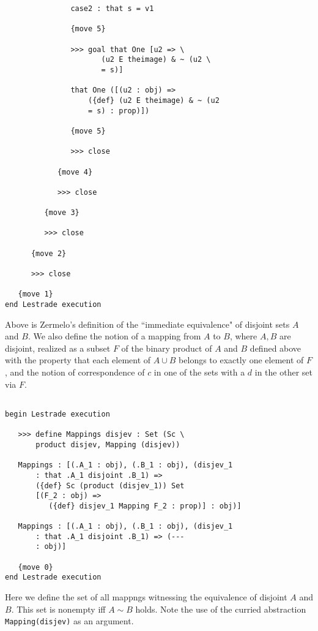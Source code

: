 \documentclass[12pt]{article}
\begin{document}
\begin{verbatim}
               case2 : that s = v1

               {move 5}

               >>> goal that One [u2 => \
                      (u2 E theimage) & ~ (u2 \
                      = s)]

               that One ([(u2 : obj) => 
                   ({def} (u2 E theimage) & ~ (u2 
                   = s) : prop)])

               {move 5}

               >>> close

            {move 4}

            >>> close

         {move 3}

         >>> close

      {move 2}

      >>> close

   {move 1}
end Lestrade execution
\end{verbatim}

Above is Zermelo's definition of the ``immediate equivalence" of disjoint sets $A$ and $B$.  We also define the notion of a mapping from $A$ to $B$, where $A,B$ are disjoint, 
realized as a subset $F$ of the binary product of $A$ and $B$ defined above with the property that each element of $A \cup B$ belongs to exactly one element of $F$, and the notion of correspondence of $c$ in one of the sets with a $d$ in the other set via $F$.

\begin{verbatim}

begin Lestrade execution

   >>> define Mappings disjev : Set (Sc \
       product disjev, Mapping (disjev))

   Mappings : [(.A_1 : obj), (.B_1 : obj), (disjev_1 
       : that .A_1 disjoint .B_1) => 
       ({def} Sc (product (disjev_1)) Set 
       [(F_2 : obj) => 
          ({def} disjev_1 Mapping F_2 : prop)] : obj)]

   Mappings : [(.A_1 : obj), (.B_1 : obj), (disjev_1 
       : that .A_1 disjoint .B_1) => (--- 
       : obj)]

   {move 0}
end Lestrade execution
\end{verbatim}

Here we define the set of all mappngs witnessing the equivalence of disjoint $A$ and $B$.  This set is nonempty iff $A \sim B$ holds.  Note the use of the curried abstraction
{\tt Mapping(disjev)} as an argument.
\end{document}
